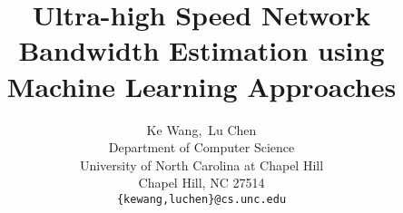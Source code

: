\documentclass{article} %
\title{Ultra-high Speed Network Bandwidth Estimation using
Machine Learning Approaches}
\author{
{Ke Wang,~Lu Chen}\\
Department of Computer Science\\
University of North Carolina at Chapel Hill\\
Chapel Hill, NC 27514\\
\texttt{\{kewang,luchen\}@cs.unc.edu}
}
\begin{document}
\maketitle








\nocite{*}


\end{document}
